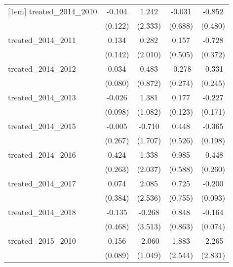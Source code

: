 {\begin{tabular}{l*{4}{c}}
[1em]
treated\_2014\_2010&      -0.104         &       1.242         &      -0.031         &      -0.852         \\
            &     (0.122)         &     (2.333)         &     (0.688)         &     (0.480)         \\
[1em]
treated\_2014\_2011&       0.134         &       0.282         &       0.157         &      -0.728         \\
            &     (0.142)         &     (2.010)         &     (0.505)         &     (0.372)         \\
[1em]
treated\_2014\_2012&       0.034         &       0.483         &      -0.278         &      -0.331         \\
            &     (0.080)         &     (0.872)         &     (0.274)         &     (0.245)         \\
[1em]
treated\_2014\_2013&      -0.026         &       1.381         &       0.177         &      -0.227         \\
            &     (0.098)         &     (1.082)         &     (0.123)         &     (0.171)         \\
[1em]
treated\_2014\_2015&      -0.005         &      -0.710         &       0.448         &      -0.365         \\
            &     (0.267)         &     (1.707)         &     (0.526)         &     (0.198)         \\
[1em]
treated\_2014\_2016&       0.424         &       1.338         &       0.985         &      -0.448         \\
            &     (0.263)         &     (2.037)         &     (0.588)         &     (0.260)         \\
[1em]
treated\_2014\_2017&       0.074         &       2.085         &       0.725         &      -0.200\sym{*}  \\
            &     (0.384)         &     (2.536)         &     (0.755)         &     (0.093)         \\
[1em]
treated\_2014\_2018&      -0.135         &      -0.268         &       0.848         &      -0.164\sym{*}  \\
            &     (0.468)         &     (3.513)         &     (0.863)         &     (0.074)         \\
[1em]
treated\_2015\_2010&       0.156         &      -2.060\sym{*}  &       1.883         &      -2.265         \\
            &     (0.089)         &     (1.049)         &     (2.544)         &     (2.831)         \\

\end{tabular}}
